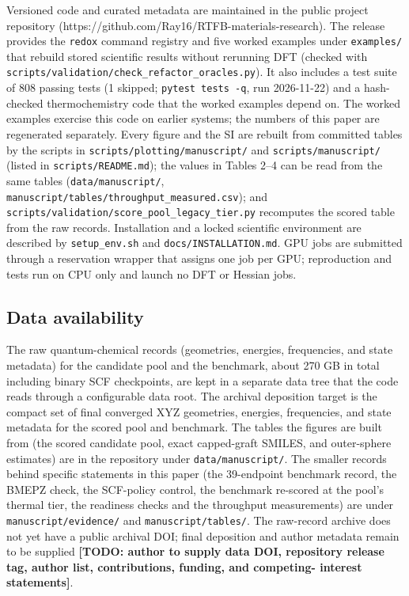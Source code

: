 \documentclass[journal=jcisd8,manuscript=article]{achemso}
\begin{document}
Versioned code and curated metadata are maintained in the public project repository (https://github.com/Ray16/RTFB-materials-research). The release provides the \texttt{redox} command registry and five worked examples under \texttt{examples/} that rebuild stored scientific results without rerunning DFT (checked with \texttt{scripts/validation/check\_refactor\_oracles.py}). It also includes a test suite of 808 passing tests (1 skipped; \texttt{pytest tests -q}, run 2026-11-22) and a hash-checked thermochemistry code that the worked examples depend on. The worked examples exercise this code on earlier systems; the numbers of this paper are regenerated separately. Every figure and the SI are rebuilt from committed tables by the scripts in \texttt{scripts/plotting/manuscript/} and \texttt{scripts/manuscript/} (listed in \texttt{scripts/README.md}); the values in Tables 2–4 can be read from the same tables (\texttt{data/manuscript/}, \texttt{manuscript/tables/throughput\_measured.csv}); and \texttt{scripts/validation/score\_pool\_legacy\_tier.py} recomputes the scored table from the raw records. Installation and a locked scientific environment are described by \texttt{setup\_env.sh} and \texttt{docs/INSTALLATION.md}. GPU jobs are submitted through a reservation wrapper that assigns one job per GPU; reproduction and tests run on CPU only and launch no DFT or Hessian jobs.

\subsection*{Data availability}

The raw quantum-chemical records (geometries, energies, frequencies, and state metadata) for the candidate pool and the benchmark, about 270 GB in total including binary SCF checkpoints, are kept in a separate data tree that the code reads through a configurable data root. The archival deposition target is the compact set of final converged XYZ geometries, energies, frequencies, and state metadata for the scored pool and benchmark. The tables the figures are built from (the scored candidate pool, exact capped-graft SMILES, and outer-sphere estimates) are in the repository under \texttt{data/manuscript/}. The smaller records behind specific statements in this paper (the 39-endpoint benchmark record, the BMEPZ check, the SCF-policy control, the benchmark re-scored at the pool's thermal tier, the readiness checks and the throughput measurements) are under \texttt{manuscript/evidence/} and \texttt{manuscript/tables/}. The raw-record archive does not yet have a public archival DOI; final deposition and author metadata remain to be supplied \textbf{[TODO: author to supply data DOI, repository release tag, author list, contributions, funding, and competing- interest statements]}.


\end{document}
